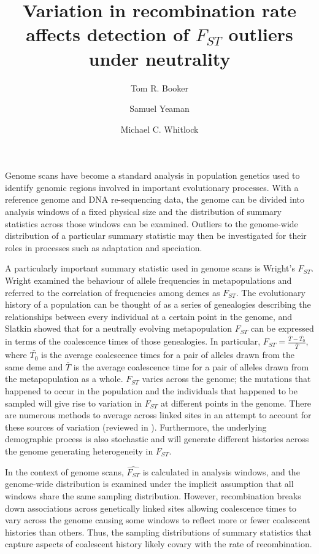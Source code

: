 \documentclass[9pt,twocolumn,twoside]{pnas-new}
\title{Variation in recombination rate affects detection of $F_{ST}$ outliers under neutrality}
\author[a,b,1]{Tom R. Booker}
\author[c]{Samuel Yeaman}
\author[b,d]{Michael C. Whitlock}
\affil[a]{Department of Forest and Conservation Sciences, University of British Columbia, Vancouver, Canada}
\affil[b]{Biodiversity Research Centre, University of British Columbia, Vancouver, Canada}
\affil[c]{Department of Biological Sciences, University of Calgary, Calgary, Canada}
\affil[d]{Department of Zoology, University of British Columbia, Vancouver, Canada}
\begin{document}
\maketitle
\thispagestyle{firststyle}


Genome scans have become a standard analysis in population genetics used to identify genomic regions involved in important evolutionary processes. With a reference genome and DNA re-sequencing data, the genome can be divided into analysis windows of a fixed physical size and the distribution of summary statistics across those windows can be examined. Outliers to the genome-wide distribution of a particular summary statistic may then be investigated for their roles in processes such as adaptation and speciation. 

A particularly important summary statistic used in genome scans is Wright's $F_{ST}$. Wright \citep{RN200} examined the behaviour of allele frequencies in metapopulations and referred to the correlation of frequencies among demes as $F_{ST}$. The evolutionary history of a population can be thought of as a series of genealogies describing the relationships between every individual at a certain point in the genome, and Slatkin \citep{Slatkin1991} showed that for a neutrally evolving metapopulation $F_{ST}$ can be expressed in terms of the coalescence times of those genealogies. In particular, \begin{math} F_{ST} = \frac{\bar{T} - \bar{T_0}}{\bar{T}} \end{math}, where $\bar{T_0}$ is the average coalescence times for a pair of alleles drawn from the same deme and $\bar{T}$ is the average coalescence time for a pair of alleles drawn from the metapopulation as a whole. $F_{ST}$ varies across the genome; the mutations that happened to occur in the population and the individuals that happened to be sampled will give rise to variation in $F_{ST}$ at different points in the genome. There are numerous methods to average across linked sites in an attempt to account for these sources of variation (reviewed in \citep{Holsinger2009}). Furthermore, the underlying demographic process is also stochastic and will generate different histories across the genome generating heterogeneity in $F_{ST}$.  

In the context of genome scans, $\hat{F_{ST}}$ is calculated in analysis windows, and the genome-wide distribution is examined under the implicit assumption that all windows share the same sampling distribution. However, recombination breaks down associations across genetically linked sites allowing coalescence times to vary across the genome causing some windows to reflect more or fewer coalescent histories than others. Thus, the sampling distributions of summary statistics that capture aspects of coalescent history likely covary with the rate of recombination.
\end{document}
